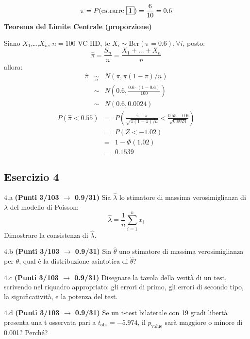 \documentclass[
  11pt,
]{book}
\theoremstyle{mytheoremstyle}
\theoremstyle{mydefstyle}
\newenvironment{sol}
  {
  \begin{tcolorbox}[enhanced,breakable,arc=0.1mm,boxrule=1pt,colback=white,colframe=iblue,
  title=\bf \fontfamily{lmss}\selectfont \hspace{.5 cm} Soluzione,drop fuzzy shadow]

}{
\end{tcolorbox}
  }
\begin{document}
\begin{sol}
\[
\pi = P(\text{estrarre $\fbox{1}$})=\frac {6}{10}=0.6
\]
\textbf{Teorema del Limite Centrale (proporzione)}

Siano \(X_1\),\ldots,\(X_n\), \(n=100\) VC IID, tc \(X_i\sim\text{Ber}(\pi=0.6)\)\(,\forall i\), posto:
\[
      \hat\pi=\frac{S_n}n = \frac{X_1 + ... + X_n}n
      \]
allora:\begin{eqnarray*}
  \hat\pi & \mathop{\sim}\limits_{a}& N(\pi,\pi(1-\pi)/n) \\
  &\sim & N\left(0.6,\frac{0.6\cdot(1-0.6)}{100}\right) \\
     &\sim & N(0.6,0.0024) 
  \end{eqnarray*}\begin{eqnarray*}
      P( \hat\pi   <   0.55 ) 
        &=& P\left(  \frac { \hat\pi  -  \pi }{ \sqrt{\pi(1-\pi)/n} }  <  \frac { 0.55  -  0.6 }{\sqrt{ 0.0024 }} \right)  \\
                 &=& P\left(  Z   <   -1.02 \right) \\    
                 &=&  1-\Phi( 1.02 ) \\ &=&  0.1539 
      \end{eqnarray*}

\end{sol}

\subsection{Esercizio 4}\label{esercizio-4-50}

4.a \textbf{(Punti 3/103 \(\rightarrow\) 0.9/31)} Sia \(\hat\lambda\) lo stimatore di massima
verosimiglianza di \(\lambda\) del modello di Poisson:
\[
\hat\lambda =  \frac 1n\sum_{i=1}^n x_i
\]
Dimostrare la consistenza di \(\hat\lambda\).

4.b \textbf{(Punti 3/103 \(\rightarrow\) 0.9/31)} Sia \(\hat\theta\) uno stimatore di massima verosimiglianza per \(\theta\), qual è la distribuzione asintotica di \(\hat\theta\)?

4.c \textbf{(Punti 3/103 \(\rightarrow\) 0.9/31)} Disegnare la tavola della verità di un test, scrivendo nel riquadro appropriato: gli errori di primo, gli errori di secondo tipo, la significatività, e la potenza del test.

4.d \textbf{(Punti 3/103 \(\rightarrow\) 0.9/31)} Se un t-test bilaterale con 19 gradi libertà presenta una
t osservata pari a \(t_\text{obs}=-5.974\), il \(p_\text{value}\) sarà maggiore o minore di 0.001? Perché?
\end{document}
